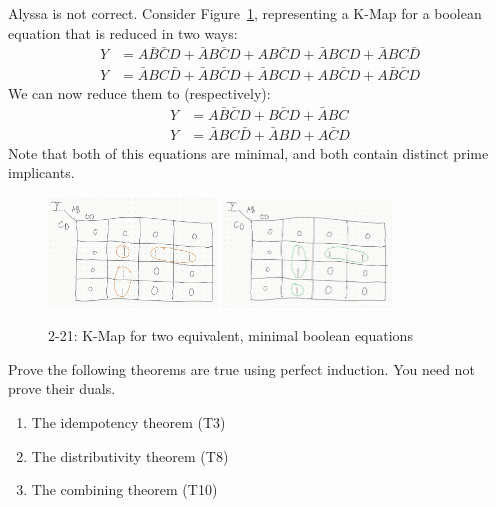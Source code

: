 \documentclass[12pt]{article}
\newenvironment{ex}[2][Exercise]{\begin{trivlist}
		\item[\hskip \labelsep {\bfseries #1}\hskip \labelsep {\bfseries #2.}]}{\end{trivlist}}
\newenvironment{sol}[1][Solution]{\begin{trivlist}
		\item[\hskip \labelsep {\bfseries #1:}]}{\end{trivlist}}
\begin{document}
\begin{sol}
	Alyssa is not correct. Consider Figure~\ref{2-21-kmaps}, representing
	a K-Map for a boolean equation that is reduced in two ways:
	\begin{align*}
		Y&=A\bar{B}\bar{C}D+\bar{A}B\bar{C}D+AB\bar{C}D+\bar{A}BCD+\bar{A}BC\bar{D}\\
		Y&=\bar{A}BC\bar{D}+\bar{A}B\bar{C}D+\bar{A}BCD+AB\bar{C}D+A\bar{B}\bar{C}D
	\end{align*}
	We can now reduce them to (respectively):
	\begin{align*}
		Y&=A\bar{B}\bar{C}D+B\bar{C}D+\bar{A}BC\\
		Y&=\bar{A}BC\bar{D}+\bar{A}BD+A\bar{C}D
	\end{align*}
	Note that both of this equations are minimal, and both contain distinct prime implicants.
	\begin{figure}
		\centering
		\includegraphics[width=0.4\textwidth]{02-21-kmap-min1}
		\includegraphics[width=0.4\textwidth]{02-21-kmap-min2}
		\caption{2-21: K-Map for two equivalent, minimal boolean equations}
		\label{2-21-kmaps}
	\end{figure}
\end{sol}

\begin{ex}{2.22}
	Prove the following theorems are true using perfect induction.
	You need not prove their duals.
	\begin{enumerate}[label=(\alph*)]
		\item The idempotency theorem (T3)
		\item The distributivity theorem (T8)
		\item The combining theorem (T10)
	\end{enumerate}
\end{ex}
\end{document}
